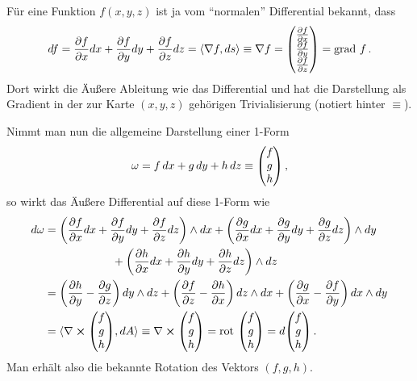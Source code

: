 \documentclass[../H_Analysis_main.tex]{subfiles}
\begin{document}
\begin{bsp}\label{bsp:gradrotdiv}
Für eine Funktion $f(x, y, z)$ ist ja vom \enquote{normalen} Differential bekannt, dass
\begin{equation*}
df = \pdv{f}{x} dx + \pdv{f}{y} dy + \pdv{f}{z} dz = \langle \nabla f, ds \rangle \equiv \nabla f = \mqty(\pdv{f}{x} \\ \pdv{f}{y} \\ \pdv{f}{z}) = \text{grad } f \, .
\end{equation*}
Dort wirkt die Äußere Ableitung wie das Differential und hat die Darstellung als Gradient in der zur Karte $(x, y, z)$ gehörigen Trivialisierung (notiert hinter $\equiv$).


Nimmt man nun die allgemeine Darstellung einer 1-Form
\begin{equation*}
\omega = f \, dx + g \, dy + h \, dz \equiv \mqty(f \\ g \\ h) \, ,
\end{equation*}
so wirkt das Äußere Differential auf diese 1-Form wie
\begin{align}
d\omega &= \qty(\pdv{f}{x} dx + \pdv{f}{y} dy + \pdv{f}{z} dz) \wedge dx + \qty(\pdv{g}{x} dx + \pdv{g}{y} dy + \pdv{g}{z} dz) \wedge dy 
\notag\\
& \qquad \qquad \qquad + \qty(\pdv{h}{x} dx + \pdv{h}{y} dy + \pdv{h}{z} dz) \wedge dz
\notag\\
&= \qty(\pdv{h}{y} - \pdv{g}{z}) \, dy \wedge dz + \qty(\pdv{f}{z} - \pdv{h}{x}) \, dz \wedge dx + \qty(\pdv{g}{x} - \pdv{f}{y}) \, dx \wedge dy
\notag\\
&= \langle \nabla \cross \mqty(f \\ g \\ h), dA \rangle \equiv \nabla \cross \mqty(f \\ g \\ h) = \text{rot } \mqty(f \\ g \\ h) = d\mqty(f \\ g \\ h) \, .
\end{align}
Man erhält also die bekannte Rotation des Vektors $(f, g, h)$.


\end{bsp}
\end{document}
